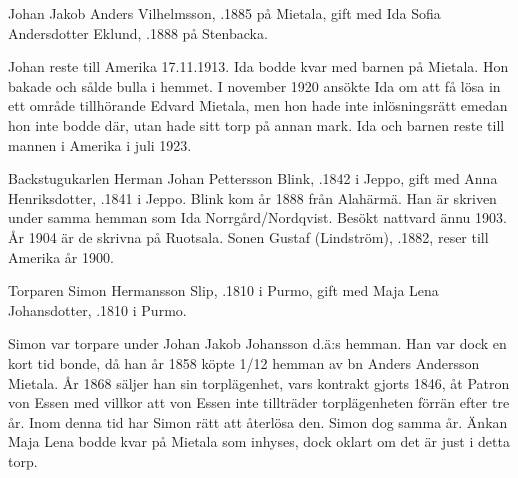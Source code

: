 
Johan Jakob Anders Vilhelmsson, .1885 på Mietala, gift med Ida Sofia Andersdotter Eklund, .1888 på Stenbacka.
\begin{jhchildren}
  \item {}
  \item {}
  \item {}
\end{jhchildren}
Johan reste till Amerika 17.11.1913. Ida bodde kvar med barnen på Mietala. Hon bakade och sålde bulla i hemmet. I november 1920 ansökte Ida om att få lösa in ett område tillhörande Edvard Mietala, men hon hade inte inlösningsrätt emedan hon inte bodde där, utan hade sitt torp på annan mark. Ida och barnen reste till mannen i Amerika i juli 1923.


Backstugukarlen Herman Johan Pettersson Blink, .1842 i Jeppo, gift med Anna Henriksdotter, .1841 i Jeppo. Blink kom år 1888 från Alahärmä. Han är skriven under samma hemman som Ida Norrgård/Nordqvist. Besökt nattvard ännu 1903. År 1904 är de skrivna på Ruotsala. Sonen Gustaf (Lindström), .1882, reser till Amerika år 1900.


Torparen Simon Hermansson Slip, .1810 i Purmo, gift med Maja Lena Johansdotter, .1810 i Purmo.
\begin{jhchildren}
  \item {}
  \item {}
  \item {}
  \item {}
  \item {}
  \item {}
\end{jhchildren}
Simon var torpare under Johan Jakob Johansson d.ä:s hemman. Han var dock en kort tid bonde, då han år 1858 köpte 1/12 hemman av bn Anders Andersson Mietala. År 1868 säljer han sin torplägenhet, vars kontrakt gjorts 1846, åt Patron von Essen med villkor att von Essen inte tillträder torplägenheten förrän efter tre år. Inom denna tid har Simon rätt att återlösa den. Simon dog samma år. Änkan Maja Lena bodde kvar på Mietala som inhyses, dock oklart om det är just i detta torp.


